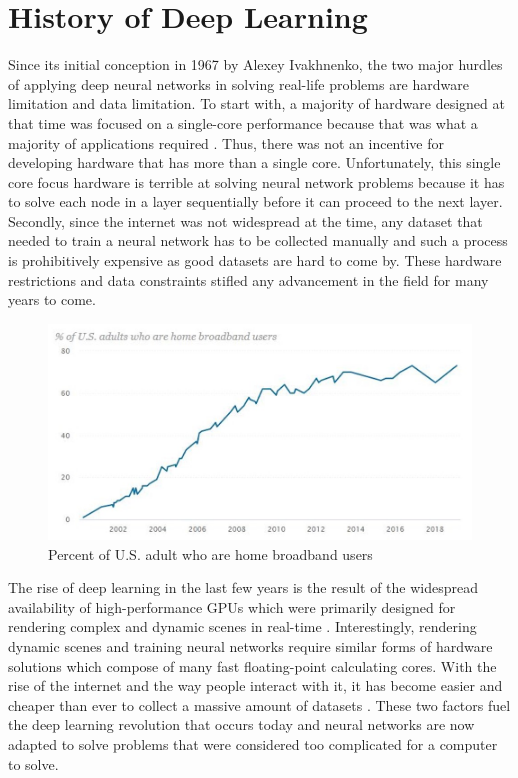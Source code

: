 \documentclass[conference]{IEEEtran}
\begin{document}
    
    \section{History of Deep Learning}
        Since its initial conception in 1967 by Alexey Ivakhnenko, the two major hurdles of applying deep neural networks in solving real-life problems are hardware limitation and data limitation. To start with, a majority of hardware designed at that time was focused on a single-core performance because that was what a majority of applications required \cite{inproceedings}. Thus, there was not an incentive for developing hardware that has more than a single core. Unfortunately, this single core focus hardware is terrible at solving neural network problems because it has to solve each node in a layer sequentially before it can proceed to the next layer. Secondly, since the internet was not widespread at the time, any dataset that needed to train a neural network has to be collected manually \cite{pew_research_center} and such a process is prohibitively expensive as good datasets are hard to come by. These hardware restrictions and data constraints stifled any advancement in the field for many years to come.

        \begin{figure}[!htb]
            \centering
            \captionsetup{justification=centering}
            \includegraphics[width=\linewidth]{USBroadband.png}
            \caption{Percent of U.S. adult who are home broadband users}  
        \end{figure}

        The rise of deep learning in the last few years is the result of the widespread availability of high-performance GPUs which were primarily designed for rendering complex and dynamic scenes in real-time \cite{nickolls_dally_2010}. Interestingly, rendering dynamic scenes and training neural networks require similar forms of hardware solutions which compose of many fast floating-point calculating cores. With the rise of the internet and the way people interact with it, it has become easier and cheaper than ever to collect a massive amount of datasets \cite{deng_dong_socher_li_li_fei-fei_2009}. These two factors fuel the deep learning revolution that occurs today and neural networks are now adapted to solve problems that were considered too complicated for a computer to solve.
        
\end{document}
